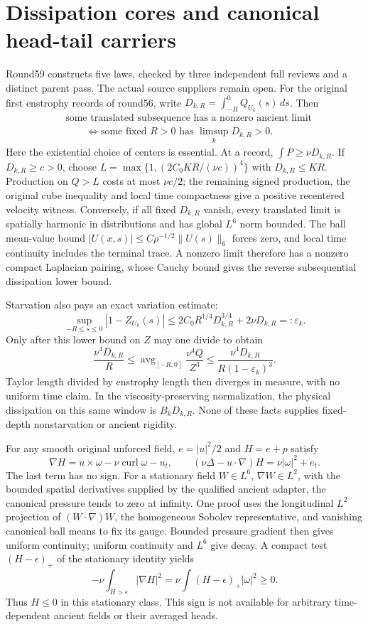 \documentclass[11pt]{article}
\begin{document}
\section{Dissipation cores and canonical head-tail carriers}

Round59 constructs five laws, checked by three independent full reviews
and a distinct parent pass. The actual source suppliers remain open.
For the original first enstrophy records of round56, write
$D_{k,R}=\int_{-R}^0Q_{U_k}(s)\,ds$. Then
\[
 \begin{aligned}
 &\text{some translated subsequence has a nonzero ancient limit}\\
 &\qquad\Longleftrightarrow
 \text{some fixed }R>0\text{ has }\limsup_kD_{k,R}>0.
 \end{aligned}
\]
Here the existential choice of centers is essential. At a record,
$\int P\ge\nu D_{k,R}$. If $D_{k,R}\ge c>0$, choose
$L=\max\{1,(2C_0KR/(\nu c))^4\}$ with $D_{k,R}\le KR$.
Production on $Q>L$ costs at most $\nu c/2$; the remaining signed
production, the original cube inequality and local time compactness
give a positive recentered velocity witness. Conversely, if all fixed
$D_{k,R}$ vanish, every translated limit is spatially harmonic in
distributions and has global $L^6$ norm bounded. The ball mean-value bound
$|U(x,s)|\le C\rho^{-1/2}\|U(s)\|_6$ forces zero, and local time
continuity includes the terminal trace. A nonzero limit therefore has a
nonzero compact Laplacian pairing, whose Cauchy bound gives the reverse
subsequential dissipation lower bound.

Starvation also pays an exact variation estimate:
\[
 \sup_{-R\le s\le0}|1-Z_{U_k}(s)|
 \le2C_0R^{1/4}D_{k,R}^{3/4}+2\nu D_{k,R}=:\varepsilon_k.
\]
Only after this lower bound on $Z$ may one divide to obtain
\[
 \frac{\nu^4D_{k,R}}R\le
 \mathop{\mathrm{avg}}_{[-R,0]}\frac{\nu^4Q}{Z^3}
 \le\frac{\nu^4D_{k,R}}{R(1-\varepsilon_k)^3}.
\]
Taylor length divided by enstrophy length then diverges in measure,
with no uniform time claim. In the viscosity-preserving normalization,
the physical dissipation on this same window is $B_kD_{k,R}$.
None of these facts supplies fixed-depth nonstarvation or ancient rigidity.

For any smooth original unforced field, $e=|u|^2/2$ and $H=e+p$ satisfy
\[
 \nabla H=u\times\omega-\nu\operatorname{curl}\omega-u_t,
 \qquad (\nu\Delta-u\cdot\nabla)H=\nu|\omega|^2+e_t.
\]
The last term has no sign. For a stationary field $W\in L^6$,
$\nabla W\in L^2$, with the bounded spatial derivatives supplied by the
qualified ancient adapter, the canonical pressure tends to zero at infinity.
One proof uses the longitudinal $L^2$ projection of $(W\cdot\nabla)W$,
the homogeneous Sobolev representative, and vanishing canonical ball means
to fix its gauge. Bounded pressure gradient then gives uniform continuity;
uniform continuity and $L^6$ give decay. A compact test
$(H-\epsilon)_+$ of the stationary identity yields
\[
 -\nu\int_{H>\epsilon}|\nabla H|^2
 =\nu\int(H-\epsilon)_+|\omega|^2\ge0.
\]
Thus $H\le0$ in this stationary class. This sign is not available for
arbitrary time-dependent ancient fields or their averaged heads.
\end{document}
